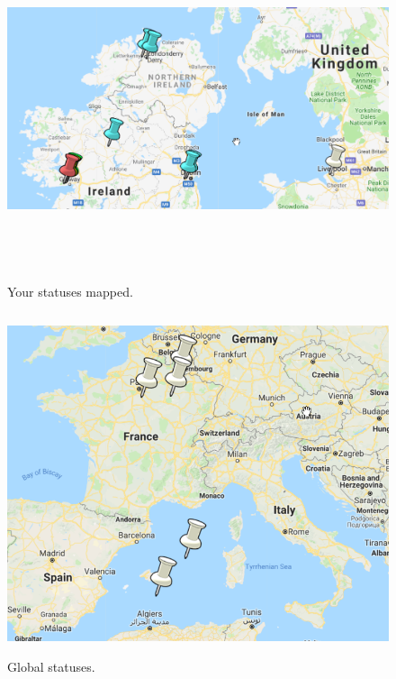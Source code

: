 \begin{figure}[H]
\centering
\includegraphics[width=16cm, height=10cm]{img/map1.png}
\caption{Your statuses mapped.}
\end{figure}

\begin{figure}[H]
\centering
\includegraphics[width=16cm, height=10cm]{img/map2.png}
\caption{Global statuses.}
\end{figure}

